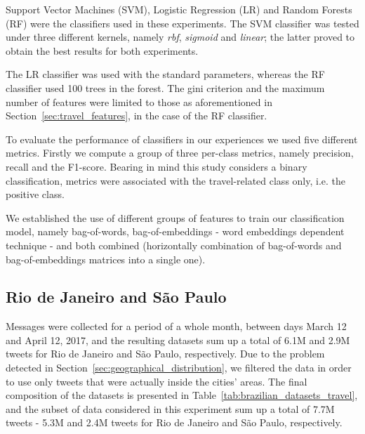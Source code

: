 Support Vector Machines (SVM), Logistic Regression (LR) and Random Forests (RF) were the classifiers used in these experiments. The SVM classifier was tested under three different kernels, namely \textit{rbf}, \textit{sigmoid} and \textit{linear}; the latter proved to obtain the best results for both experiments. 

The LR classifier was used with the standard parameters, whereas the RF classifier used 100 trees in the forest. The gini criterion and the maximum number of features were limited to those as aforementioned in Section~\ref{sec:travel_features}, in the case of the RF classifier.

To evaluate the performance of classifiers in our experiences we used five different metrics. Firstly we compute a group of three per-class metrics, namely precision, recall and the F1-score. Bearing in mind this study considers a binary classification, metrics were associated with the travel-related class only, i.e. the positive class.

We established the use of different groups of features to train our classification model, namely bag-of-words, bag-of-embeddings - word embeddings dependent technique - and both combined (horizontally combination of bag-of-words and bag-of-embeddings matrices into a single one).

\subsection{Rio de Janeiro and São Paulo}
\label{subsec:rio_de_janeiro_sao_paulo_experiment}

Messages were collected for a period of a whole month, between days March 12 and April 12, 2017, and the resulting datasets sum up a total of 6.1M and 2.9M tweets for Rio de Janeiro and São Paulo, respectively. Due to the problem detected in Section~\ref{sec:geographical_distribution}, we filtered the data in order to use only tweets that were actually inside the cities' areas. The final composition of the datasets is presented in Table~\ref{tab:brazilian_datasets_travel}, and the subset of data considered in this experiment sum up a total of 7.7M tweets -  5.3M and 2.4M tweets for Rio de Janeiro and São Paulo, respectively.

